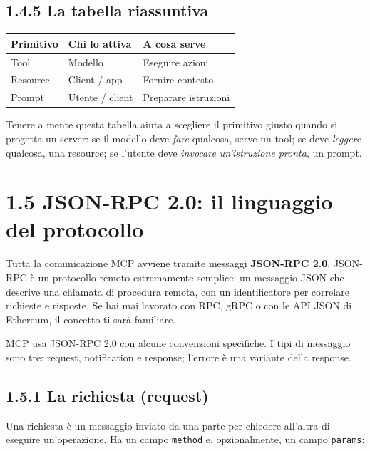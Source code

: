 \documentclass[
  italian,
  10pt,
]{book}
\newcounter{none} %
\begin{document}
\subsection{1.4.5 La tabella riassuntiva}\label{la-tabella-riassuntiva}

{\def\LTcaptype{none} %
\begin{longtable}[]{@{}lll@{}}
\toprule\noalign{}
Primitivo & Chi lo attiva & A cosa serve \\
\midrule\noalign{}
\endhead
\bottomrule\noalign{}
\endlastfoot
Tool & Modello & Eseguire azioni \\
Resource & Client / app & Fornire contesto \\
Prompt & Utente / client & Preparare istruzioni \\
\end{longtable}
}

Tenere a mente questa tabella aiuta a scegliere il primitivo giusto
quando si progetta un server: se il modello deve \emph{fare} qualcosa,
serve un tool; se deve \emph{leggere} qualcosa, una resource; se
l'utente deve \emph{invocare un'istruzione pronta}, un prompt.

\section{1.5 JSON-RPC 2.0: il linguaggio del
protocollo}\label{json-rpc-2.0-il-linguaggio-del-protocollo}

Tutta la comunicazione MCP avviene tramite messaggi \textbf{JSON-RPC
2.0}. JSON-RPC è un protocollo remoto estremamente semplice: un
messaggio JSON che descrive una chiamata di procedura remota, con un
identificatore per correlare richieste e risposte. Se hai mai lavorato
con RPC, gRPC o con le API JSON di Ethereum, il concetto ti sarà
familiare.

MCP usa JSON-RPC 2.0 con alcune convenzioni specifiche. I tipi di
messaggio sono tre: request, notification e response; l'errore è una
variante della response.

\subsection{1.5.1 La richiesta (request)}\label{la-richiesta-request}

Una richiesta è un messaggio inviato da una parte per chiedere all'altra
di eseguire un'operazione. Ha un campo \texttt{method} e, opzionalmente,
un campo \texttt{params}:
\end{document}
